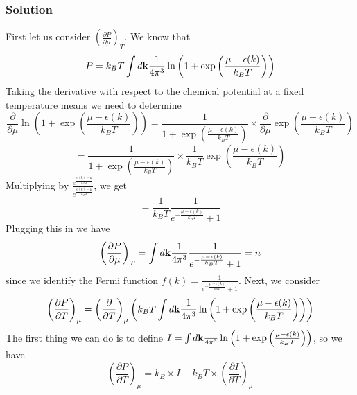\documentclass[12pt]{article}
\begin{document}
\subsubsection{Solution}
First let us consider $\left( \frac{\partial P}{\partial \mu} \right)_T$. We know that
\begin{equation}
    P = k_B T \int d \vb{k} \frac{1}{4\pi^3} \ln \left( 1 + \exp \left( \frac{\mu - \epsilon(k)}{k_B T} \right) \right)
\end{equation}
Taking the derivative with respect to the chemical potential at a fixed temperature means we need to determine
\begin{equation}
    \frac{\partial}{\partial \mu} \ln \left( 1 + \exp \left( \frac{\mu - \epsilon(k)}{k_B T} \right) \right) = \frac{1}{1 + \exp \left( \frac{\mu - \epsilon(k)}{k_B T} \right)} \times \frac{\partial}{\partial \mu} \exp \left( \frac{\mu - \epsilon(k)}{k_B T} \right)
\end{equation}
\begin{equation}
    = \frac{1}{1 + \exp \left( \frac{\mu - \epsilon(k)}{k_B T} \right)} \times \frac{1}{k_B T} \exp \left( \frac{\mu - \epsilon(k)}{k_B T} \right)
\end{equation}
Multiplying by $\frac{e^{\frac{\epsilon(k) - \mu}{k_B T}}}{e^{\frac{\epsilon(k) - \mu}{k_B T}}}$, we get
\begin{equation}
    = \frac{1}{k_B T} \frac{1}{e^{-\frac{\mu - \epsilon(k)}{k_B T}} + 1}
\end{equation}
Plugging this in we have
\begin{equation}
    \left( \frac{\partial P}{\partial \mu} \right)_T = \int d \vb{k} \frac{1}{4\pi^3} \frac{1}{e^{-\frac{\mu - \epsilon(k)}{k_B T}} + 1} = n
\end{equation}
since we identify the Fermi function $f(k)=\frac{1}{e^{-\frac{\mu - \epsilon(k)}{k_B T}} + 1}$.
Next, we consider 
\begin{equation}
    \left( \frac{\partial P}{\partial T} \right)_\mu = \left( \frac{\partial}{\partial T} \right)_\mu \left( k_B T \int d \vb{k} \frac{1}{4\pi^3} \ln \left( 1 + \exp \left( \frac{\mu - \epsilon(k)}{k_B T} \right) \right) \right)
\end{equation}
The first thing we can do is to define $I = \int d \vb{k} \frac{1}{4\pi^3} \ln \left( 1 + \exp \left( \frac{\mu - \epsilon(k)}{k_B T} \right) \right)$, so we have
\begin{equation}
    \left( \frac{\partial P}{\partial T} \right)_\mu = k_B \times I + k_B T \times \left( \frac{\partial I}{\partial T} \right)_\mu
\end{equation}
\end{document}
